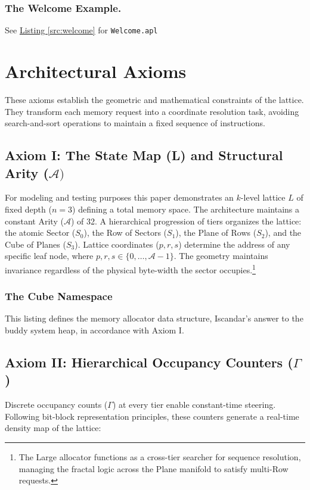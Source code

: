 \documentclass[11pt]{article}
\newcommand{\srclink}[2]{See \hyperlink{#2}{\color{blue}Listing \ref*{#2}} for \texttt{#1}}
\begin{document}
\subsubsection{The Welcome Example.}

\srclink{Welcome.apl}{src:welcome}



\section{Architectural Axioms}

These axioms establish the geometric and mathematical constraints of the lattice. They transform each memory request into a coordinate resolution task, avoiding search-and-sort operations to maintain a fixed sequence of instructions.

\subsection{Axiom I: The State Map (L) and Structural Arity ($\mathcal{A})$}

For modeling and testing purposes this paper demonstrates an $k$-level lattice $L$ of fixed depth ($n=3$) defining a total memory space. The architecture maintains a constant Arity ($\mathcal{A}$) of 32. A hierarchical progression of tiers organizes the lattice: the atomic Sector ($S_{0}$), the Row of Sectors ($S_{1}$), the Plane of Rows ($S_{2}$), and the Cube of Planes ($S_{3}$). Lattice coordinates ($p, r, s$) determine the address of any specific leaf node, where $p, r, s \in \{0, \dots, \mathcal{A}-1\}$. The geometry maintains invariance regardless of the physical byte-width the sector occupies.\footnote[2]{The Large allocator functions as a cross-tier searcher for sequence resolution, managing the fractal logic across the Plane manifold to satisfy multi-Row requests.}

\subsubsection{The Cube Namespace}
This listing defines the memory allocator data structure, Iscandar's answer to the buddy system heap, in accordance with Axiom I.



\subsection{Axiom II: Hierarchical Occupancy Counters ($\Gamma$)}
Discrete occupancy counts ($\Gamma$) at every tier enable constant-time steering. Following bit-block representation principles, these counters generate a real-time density map of the lattice:
\end{document}
